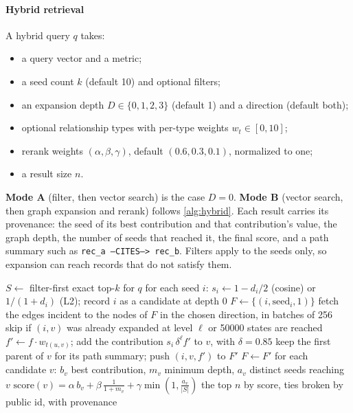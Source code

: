 \documentclass[preprint,12pt,a4paper]{elsarticle}
\newcommand{\code}[1]{\texttt{#1}}
\begin{document}
\paragraph{Hybrid retrieval} A hybrid query $q$ takes:
\begin{itemize}
  \item a query vector and a metric;
  \item a seed count $k$ (default 10) and optional filters;
  \item an expansion depth $D \in \{0,1,2,3\}$ (default 1) and a direction (default both);
  \item optional relationship types with per-type weights $w_t \in [0,10]$;
  \item rerank weights $(\alpha,\beta,\gamma)$, default $(0.6, 0.3, 0.1)$, normalized to one;
  \item a result size $n$.
\end{itemize}
\textbf{Mode A} (filter, then vector search) is the case $D = 0$. \textbf{Mode B} (vector search, then graph expansion and rerank) follows \cref{alg:hybrid}. Each result carries its provenance: the seed of its best contribution and that contribution's value, the graph depth, the number of seeds that reached it, the final score, and a path summary such as \code{rec\_a --CITES--> rec\_b}. Filters apply to the seeds only, so expansion can reach records that do not satisfy them.

\begin{algorithm}[htbp]
\caption{Hybrid retrieval, Mode B, as implemented in \nolinkurl{packages/core/src/hybrid/service.ts}.}
\label{alg:hybrid}
\small
\begin{algorithmic}[1]
\State $S \gets$ filter-first exact top-$k$ for $q$
\State for each seed $i$: $s_i \gets 1 - d_i/2$ (cosine) or $1/(1+d_i)$ (L2); record $i$ as a candidate at depth 0
\State $F \gets \{(i, \mathrm{seed}_i, 1)\}$
  \State fetch the edges incident to the nodes of $F$ in the chosen direction, in batches of 256
    \State skip if $(i, v)$ was already expanded at level $\ell$ or \num{50000} states are reached
    \State $f' \gets f \cdot w_{t(u,v)}$; add the contribution $s_i\,\delta^{\ell} f'$ to $v$, with $\delta = 0.85$
    \State keep the first parent of $v$ for its path summary; push $(i, v, f')$ to $F'$
  \EndFor
  \State $F \gets F'$
\EndFor
\State for each candidate $v$: $b_v$ best contribution, $m_v$ minimum depth, $a_v$ distinct seeds reaching $v$
\State $\mathrm{score}(v) = \alpha\, b_v + \beta\,\frac{1}{1+m_v} + \gamma \min\!\left(1, \frac{a_v}{|S|}\right)$
\State \Return the top $n$ by score, ties broken by public id, with provenance
\end{algorithmic}
\end{algorithm}
\end{document}
